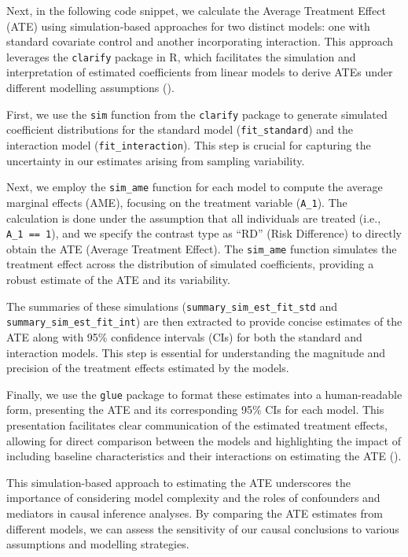 \documentclass[
  singlecolumn]{article}
\begin{document}
Next, in the following code snippet, we calculate the Average Treatment
Effect (ATE) using simulation-based approaches for two distinct models:
one with standard covariate control and another incorporating
interaction. This approach leverages the \texttt{clarify} package in R,
which facilitates the simulation and interpretation of estimated
coefficients from linear models to derive ATEs under different modelling
assumptions ().

First, we use the \texttt{sim} function from the \texttt{clarify}
package to generate simulated coefficient distributions for the standard
model (\texttt{fit\_standard}) and the interaction model
(\texttt{fit\_interaction}). This step is crucial for capturing the
uncertainty in our estimates arising from sampling variability.

Next, we employ the \texttt{sim\_ame} function for each model to compute
the average marginal effects (AME), focusing on the treatment variable
(\texttt{A\_1}). The calculation is done under the assumption that all
individuals are treated (i.e., \texttt{A\_1\ ==\ 1}), and we specify the
contrast type as ``RD'' (Risk Difference) to directly obtain the ATE
(Average Treatment Effect). The \texttt{sim\_ame} function simulates the
treatment effect across the distribution of simulated coefficients,
providing a robust estimate of the ATE and its variability.

The summaries of these simulations (\texttt{summary\_sim\_est\_fit\_std}
and \texttt{summary\_sim\_est\_fit\_int}) are then extracted to provide
concise estimates of the ATE along with 95\% confidence intervals (CIs)
for both the standard and interaction models. This step is essential for
understanding the magnitude and precision of the treatment effects
estimated by the models.

Finally, we use the \texttt{glue} package to format these estimates into
a human-readable form, presenting the ATE and its corresponding 95\% CIs
for each model. This presentation facilitates clear communication of the
estimated treatment effects, allowing for direct comparison between the
models and highlighting the impact of including baseline characteristics
and their interactions on estimating the ATE
().

This simulation-based approach to estimating the ATE underscores the
importance of considering model complexity and the roles of confounders
and mediators in causal inference analyses. By comparing the ATE
estimates from different models, we can assess the sensitivity of our
causal conclusions to various assumptions and modelling strategies.
\end{document}
